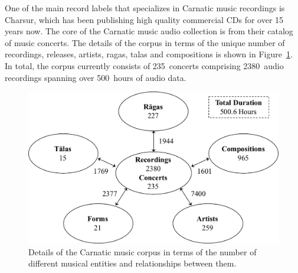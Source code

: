 One of the main record labels that specializes in Carnatic music recordings is Charsur, which has been publishing high quality commercial CDs for over 15 years now. The core of the Carnatic music audio collection is from their catalog of music concerts. The details of the corpus in terms of the unique number of recordings, releases, artists, \glspl{raga}, \glspl{tala} and compositions is shown in Figure~\ref{fig:carnatic_corpus_details}. In total, the corpus currently consists of 235~concerts comprising 2380~audio recordings spanning over 500~hours of audio data.

\begin{figure}
	\begin{center}
		\includegraphics[width=\figSizeNinety]{ch04_datasets/figures/carnatic_corpus_main.pdf}
	\end{center}
	\caption[Details of the Carnatic music corpus]{Details of the Carnatic music corpus in terms of the number of different musical entities and relationships between them.}
	\label{fig:carnatic_corpus_details}
\end{figure}

